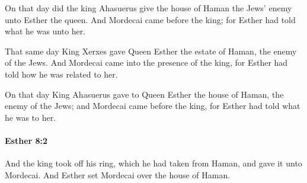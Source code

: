 			\begin{versebox}
					\item[BHS] 
					\item[LXX] 
					\item[ASV] On that day did the king Ahasuerus give the house of Haman the Jews' enemy unto Esther the queen. And Mordecai came before the king; for Esther had told what he was unto her.
					\item[NIV] That same day King Xerxes gave Queen Esther the estate of Haman, the enemy of the Jews. And Mordecai came into the presence of the king, for Esther had told how he was related to her.
					\item[NRSV] On that day King Ahasuerus gave to Queen Esther the house of Haman, the enemy of the Jews; and Mordecai came before the king, for Esther had told what he was to her.
			\end{versebox}

		\paragraph{Esther 8:2} %
			\label{ESTHER-8-2}

			And the king took off his ring, which he had taken from Haman, and gave it unto Mordecai. And Esther set Mordecai over the house of Haman.

